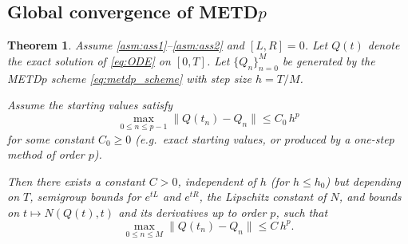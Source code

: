 \documentclass[12pt]{article}
\newtheorem{thm}{Theorem}
\begin{document}
\subsection{Global convergence of METD\texorpdfstring{$p$}{p}}

\begin{thm}
\label{thm:metdp_global}
Assume \ref{asm:ass1}--\ref{asm:ass2} and $[L,R]=0$.
Let $Q(t)$ denote the exact solution of \eqref{eq:ODE} on $[0,T]$.
Let $\{Q_n\}_{n=0}^{M}$ be generated by the METD$p$ scheme \eqref{eq:metdp_scheme} with step size $h=T/M$.

Assume the starting values satisfy
\begin{equation}\label{eq:startup_assumption}
\max_{0\le n\le p-1}\|Q(t_n)-Q_n\|\le C_0\,h^p
\end{equation}
for some constant $C_0\ge 0$ (e.g.\ exact starting values, or produced by a one-step method of order $p$).

Then there exists a constant $C>0$, independent of $h$ (for $h\le h_0$) but depending on $T$, semigroup bounds for $e^{tL}$ and $e^{tR}$, the Lipschitz constant of $N$, and bounds on $t\mapsto N(Q(t),t)$ and its derivatives up to order $p$, such that
\begin{equation}\label{eq:global_error}
\max_{0\le n\le M}\|Q(t_n)-Q_n\|\le C\,h^{p}.
\end{equation}
\end{thm}
\end{document}
